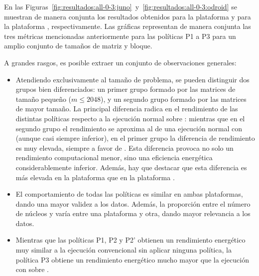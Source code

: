 En las Figuras~\ref{fig:resultados:all-0-3:juno}~y~\ref{fig:resultados:all-0-3:odroid}
se muestran de manera conjunta los resultados obtenidos para la plataforma
\juno y para la plataforma \odroid, respectivamente. Las gráficas
representan de manera conjunta las tres métricas mencionadas anteriormente
para las políticas P1 a P3 para un amplio conjunto de tamaños de matriz y
bloque.

A grandes rasgos, es posible extraer un conjunto de observaciones generales:

\begin{itemize}
\item Atendiendo exclusivamente al tamaño de problema, se pueden distinguir 
	dos grupos bien diferenciados: un primer grupo
  formado por las matrices de tamaño pequeño ($m \le 2048$), y un segundo
  grupo formado por las matrices de mayor tamaño. La principal diferencia
  radica en el rendimiento de las distintas políticas respecto a la
  ejecución normal sobre \botlev: mientras que en el segundo grupo el
  rendimiento se aproxima al de una ejecución normal con \botlev (aunque
  casi siempre inferior), en el primer grupo la diferencia de rendimiento
  es muy elevada, siempre a favor de \botlev. Esta diferencia provoca no solo un rendimiento
  computacional menor, sino una eficiencia energética considerablemente
  inferior. Además, hay que destacar que esta diferencia es más elevada en
  la plataforma \odroid que en la plataforma \juno.
\item El comportamiento de todas las políticas es similar en ambas
  plataformas, dando una mayor validez a los datos. Además, la proporción
  entre el número de núcleos \BIG y \LITTLE varía entre una plataforma y otra,
  dando mayor relevancia a los datos.
\item Mientras que las políticas P1, P2 y P2' obtienen un rendimiento
  energético muy similar a la ejecución convencional sin aplicar ninguna
  política, la política P3 obtiene un rendimiento energético mucho mayor
  que la ejecución con \botlev sobre \ompss.
\end{itemize}  

